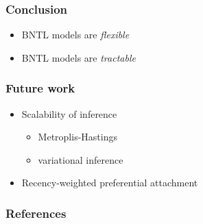 \documentclass[final,hyperref={pdfpagelabels=false},noamsthm]{beamer}
\begin{document}
\begin{frame}
	\frametitle{Conclusion}
	\begin{itemize}
		\item BNTL models are \textit{flexible}
		\item BNTL models are \textit{tractable}
	\end{itemize}
\end{frame}

\begin{frame}
	\frametitle{Future work}
	\begin{itemize}
		\item Scalability of inference
		\begin{itemize}
			\item Metroplis-Hastings
			\item variational inference \cite{linderman2017}
		\end{itemize}
		\item Recency-weighted preferential attachment
	\end{itemize}
\end{frame}

\begin{frame}
	\frametitle{References}
	\tiny{
	}
\end{frame}
\end{document}
